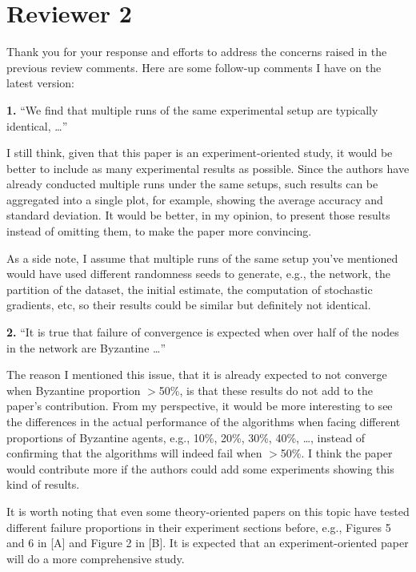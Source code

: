 \documentclass[11pt]{article}
\begin{document}
\section{Reviewer 2}

\begin{reviewquote}
Thank you for your response and efforts to address the concerns raised in the previous review comments. Here are some follow-up comments I have on the latest version:

\medskip
\textbf{1.} ``We find that multiple runs of the same experimental setup are typically identical, \ldots''

\medskip
I still think, given that this paper is an experiment-oriented study, it would be better to include as many experimental results as possible. Since the authors have already conducted multiple runs under the same setups, such results can be aggregated into a single plot, for example, showing the average accuracy and standard deviation. It would be better, in my opinion, to present those results instead of omitting them, to make the paper more convincing.

\medskip
As a side note, I assume that multiple runs of the same setup you've mentioned would have used different randomness seeds to generate, e.g., the network, the partition of the dataset, the initial estimate, the computation of stochastic gradients, etc, so their results could be similar but definitely not identical.

\medskip
\textbf{2.} ``It is true that failure of convergence is expected when over half of the nodes in the network are Byzantine \ldots''

\medskip
The reason I mentioned this issue, that it is already expected to not converge when Byzantine proportion $>$50\%, is that these results do not add to the paper's contribution. From my perspective, it would be more interesting to see the differences in the actual performance of the algorithms when facing different proportions of Byzantine agents, e.g., 10\%, 20\%, 30\%, 40\%, \ldots, instead of confirming that the algorithms will indeed fail when $>$50\%. I think the paper would contribute more if the authors could add some experiments showing this kind of results.

\medskip
It is worth noting that even some theory-oriented papers on this topic have tested different failure proportions in their experiment sections before, e.g., Figures 5 and 6 in [A] and Figure 2 in [B]. It is expected that an experiment-oriented paper will do a more comprehensive study.


\end{reviewquote}
\end{document}
